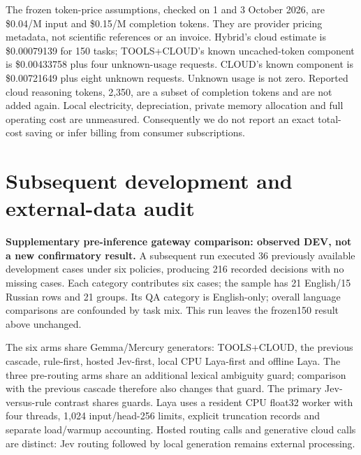 \documentclass[10pt,a4paper,twocolumn]{article}
\begin{document}
The frozen token-price assumptions, checked on 1 and 3 October 2026, are \$0.04/M input and \$0.15/M completion tokens. They are provider pricing metadata, not scientific references or an invoice. Hybrid's cloud estimate is \$0.00079139 for 150 tasks; TOOLS+CLOUD's known uncached-token component is \$0.00433758 plus four unknown-usage requests. CLOUD's known component is \$0.00721649 plus eight unknown requests. Unknown usage is not zero. Reported cloud reasoning tokens, 2,350, are a subset of completion tokens and are not added again. Local electricity, depreciation, private memory allocation and full operating cost are unmeasured. Consequently we do not report an exact total-cost saving or infer billing from consumer subscriptions.

\section{Subsequent development and external-data audit}

\textbf{Supplementary pre-inference gateway comparison: observed DEV, not a new confirmatory result.} A subsequent run executed 36 previously available development cases under six policies, producing 216 recorded decisions with no missing cases. Each category contributes six cases; the sample has 21 English/15 Russian rows and 21 groups. Its QA category is English-only; overall language comparisons are confounded by task mix. This run leaves the frozen150 result above unchanged.

The six arms share Gemma/Mercury generators: TOOLS+CLOUD, the previous cascade, rule-first, hosted Jev-first, local CPU Laya-first and offline Laya. The three pre-routing arms share an additional lexical ambiguity guard; comparison with the previous cascade therefore also changes that guard. The primary Jev-versus-rule contrast shares guards. Laya uses a resident CPU float32 worker with four threads, 1,024 input/head-256 limits, explicit truncation records and separate load/warmup accounting. Hosted routing calls and generative cloud calls are distinct: Jev routing followed by local generation remains external processing.
\end{document}
